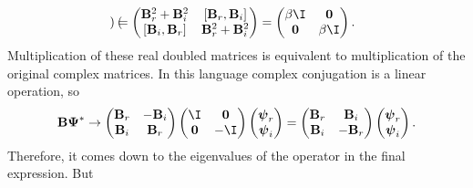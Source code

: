 \documentclass[11pt]{article}
\newcommand{\B}{\mathbf{B}}
\newcommand{\psib}{\boldsymbol{\psi}}
\newcommand{\Psib}{\boldsymbol{\Psi}}
\begin{document}
\begin{equation*}
\begin{gathered}
\begin{pmatrix}
         \end{pmatrix}
  =
         \begin{pmatrix}
           \B_r^2 + \B_i^2 & [\B_r, \B_i]    \\
           [\B_i, \B_r]    & \B_r^2 + \B_i^2 \\
         \end{pmatrix}
  =
         \begin{pmatrix}
           \beta \I   & \mathbf{0} \\
           \mathbf{0} & \beta \I   \\
         \end{pmatrix}
  .
\end{gathered}
\end{equation*}
%
Multiplication of these real doubled matrices is equivalent to multiplication of the original complex matrices.
In this language complex conjugation is a linear operation, so
%
\begin{equation*}
  \B \Psib^\ast \to
         \begin{pmatrix}
           \B_r & -\B_i \\
           \B_i &  \B_r \\
         \end{pmatrix}
         \begin{pmatrix}
           \I  & \mathbf{0} \\
           \mathbf{0} & -\I   \\
         \end{pmatrix}
         \begin{pmatrix}
           \psib_r \\
           \psib_i \\
         \end{pmatrix}
  =
         \begin{pmatrix}
           \B_r &  \B_i \\
           \B_i & -\B_r \\
         \end{pmatrix}
         \begin{pmatrix}
           \psib_r \\
           \psib_i \\
         \end{pmatrix}.
\end{equation*}
%
Therefore, it comes down to the eigenvalues of the operator in the final expression.
But
%
\end{document}
